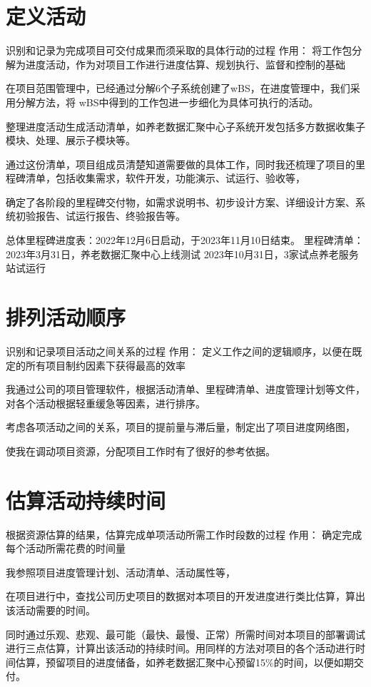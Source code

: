 \documentclass[UTF8]{../computerUniverse}
\begin{document}
\section{定义活动}

识别和记录为完成项目可交付成果而须采取的具体行动的过程
作用：
将工作包分解为进度活动，作为对项目工作进行进度估算、规划执行、监督和控制的基础


在项目范围管理中，已经通过分解6个子系统创建了wBS，在进度管理中，我们采用分解方法，将 wBS中得到的工作包进一步细化为具体可执行的活动。

整理进度活动生成活动清单，如养老数据汇聚中心子系统开发包括多方数据收集子模块、处理、展示子模块等。

通过这份清单，项目组成员清楚知道需要做的具体工作，同时我还梳理了项目的里程碑清单，包括收集需求，软件开发，功能演示、试运行、验收等，

确定了各阶段的里程碑交付物，如需求说明书、初步设计方案、详细设计方案、系统初验报告、试运行报告、终验报告等。


总体里程碑进度表：2022年12月6日启动，于2023年11月10日结束。
里程碑清单：
2023年3月31日，养老数据汇聚中心上线测试
2023年10月31日，3家试点养老服务站试运行



\section{排列活动顺序}
识别和记录项目活动之间关系的过程
作用：
定义工作之间的逻辑顺序，以便在既定的所有项目制约因素下获得最高的效率


我通过公司的项目管理软件，根据活动清单、里程碑清单、进度管理计划等文件，对各个活动根据轻重缓急等因素，进行排序。

考虑各项活动之间的关系，项目的提前量与滞后量，制定出了项目进度网络图，

使我在调动项目资源，分配项目工作时有了很好的参考依据。




\section{估算活动持续时间}
根据资源估算的结果，估算完成单项活动所需工作时段数的过程
作用：
确定完成每个活动所需花费的时间量


我参照项目进度管理计划、活动清单、活动属性等，

在项目进行中，查找公司历史项目的数据对本项目的开发进度进行类比估算，算出该活动需要的时间。

同时通过乐观、悲观、最可能（最快、最慢、正常）所需时间对本项目的部署调试进行三点估算，计算出该活动的持续时间。用同样的方法对项目的各个活动进行时间估算，预留项目的进度储备，如养老数据汇聚中心预留15\%的时间，以便如期交付。
\end{document}
